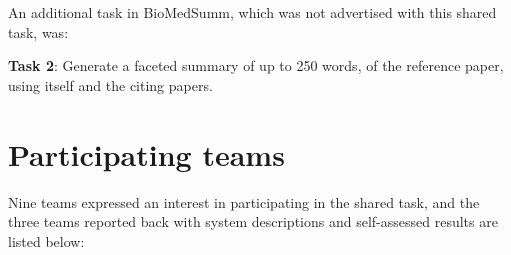 \documentclass[11pt]{article}
\begin{document}
An additional task in BioMedSumm, which was not advertised with this shared task, was:

{\bf Task 2}: Generate a faceted summary of up to 250 words, of the 
reference paper, using itself and the citing papers.


\section{Participating teams}
Nine teams expressed an interest in participating in the shared task, and the three teams reported back with system descriptions and self-assessed results are listed below:
\end{document}

